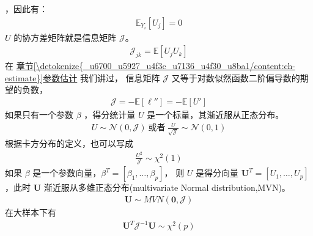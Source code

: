 \documentclass[letterpaper,10pt,english]{sphinxmanual}
\begin{document}
，因此有：
\begin{equation}\label{equation:模型评估/influence:模型评估/influence:4}
\begin{split}\mathbb{E}_{Y_i}[U_j] = 0\end{split}
\end{equation}
\(U\) 的协方差矩阵就是信息矩阵 \(\mathcal{J}\)。
\begin{equation}\label{equation:模型评估/influence:模型评估/influence:5}
\begin{split}\mathcal{J}_{jk} = \mathbb{E}[U_jU_k]\end{split}
\end{equation}
在  \hyperref[\detokenize{_u6700_u5927_u4f3c_u7136_u4f30_u8ba1/content:ch-estimate}]{章节\ref{\detokenize{_u6700_u5927_u4f3c_u7136_u4f30_u8ba1/content:ch-estimate}}参数估计} 我们讲过，
信息矩阵 \(\mathcal{J}\) 又等于对数似然函数二阶偏导数的期望的负数，
\begin{equation}\label{equation:模型评估/influence:模型评估/influence:6}
\begin{split}\mathcal{J} = - \mathbb{E}[\ell'']
= - \mathbb{E}[U']\end{split}
\end{equation}
如果只有一个参数 \(\beta\) ，得分统计量 \(U\) 是一个标量，其渐近服从正态分布。
\begin{equation}\label{equation:模型评估/influence:eq_glm_influence_015}
\begin{split}U  \sim \mathcal{N}(0,\mathcal{J})
\ \text{或者} \
\frac{U}{\sqrt{\mathcal{J}}} \sim \mathcal{N}(0,1)\end{split}
\end{equation}
根据卡方分布的定义，也可以写成
\begin{equation}\label{equation:模型评估/influence:模型评估/influence:7}
\begin{split}\frac{U^2}{\mathcal{J}}  \sim \chi^2 (1)\end{split}
\end{equation}
如果 \(\beta\) 是一个参数向量，\(\beta^T=[\beta_1,\dots,\beta_p]\)，
则 \(U\) 是得分向量 \(\textbf{U}^T=[U_1,\dots,U_p]\)
，此时  \(\textbf{U}\) 渐近服从多维正态分布(multivariate Normal distribution,MVN)。
\begin{equation}\label{equation:模型评估/influence:模型评估/influence:8}
\begin{split}\textbf{U} \sim MVN(\textbf{0},\mathbf{\mathcal{J}})\end{split}
\end{equation}
在大样本下有
\begin{equation}\label{equation:模型评估/influence:模型评估/influence:9}
\begin{split}\textbf{U}^T \mathbf{\mathcal{J}}^{-1} \textbf{U} \sim  \chi^2 (p)\end{split}
\end{equation}
\end{document}
